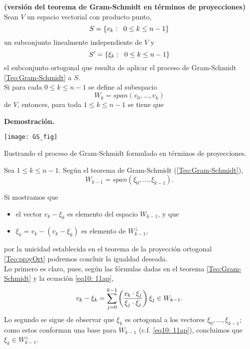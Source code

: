 \begin{prop} \label{Prop:Gram-Schmidt2}
\textbf{(versión del teorema de Gram-Schmidt en términos de
proyecciones)}
Sean $V$ un espacio vectorial con producto punto,
\[
S=\{ v_{k} : \hspace{0.2cm} 0 \leq k \leq n-1 \}
\] un subconjunto
linealmente independiente de $V$ y
\[
S' =\{ \xi_{k} : \hspace{0.2cm} 0 \leq k \leq n-1 \}
\] el subconjunto
ortogonal que resulta de aplicar el proceso de
Gram-Schmidt \ref{Teo:Gram-Schmidt} a $S$. \\

Si para cada $0 \leq k \leq n-1$ se define al subespacio
\[
W_{k}= span(v_{0}, \ldots , v_{k}) 
\]
de $V$, entonces, para toda $1 \leq k \leq n-1$
se tiene que 
\begin{center}
\end{center}
\end{prop}
\noindent
\textbf{Demostración.}

\begin{marginfigure}
\texttt{[image: GS\_fig]} 
		\caption{Ilustrando el proceso de Gram-Schmidt formulado 
		en términos de proyecciones.}
\end{marginfigure}

\noindent
Sea $1 \leq k \leq n-1$.
Según el teorema de Gram-Schmidt (\ref{Teo:Gram-Schmidt}),
\begin{equation}
\label{eq10: 11ap}
W_{k-1}=span(\xi_{0}, \ldots , \xi_{k-1}).
\end{equation}

\noindent
Si mostramos que
\begin{itemize}
	\item el vector $v_{k}-\xi_{k}$ es elemento
	del espacio $W_{k-1}$, y que
	\item $\xi_{k}=v_{k}-(v_{k}-\xi_{k})$
	es elemento de $W_{k-1}^{\perp}$,
\end{itemize}
por la unicidad establecida en
el teorema de la proyección ortogonal \ref{Teo:proyOrt}
podremos concluir la igualdad deseada. \\
Lo primero es claro, pues, según las fórmulas
dadas en el teorema \ref{Teo:Gram-Schmidt}
y la ecuación \eqref{eq10: 11ap},
\[
v_{k}-\xi_{k}= 
\sum\limits_{j=0}^{k-1}
\left( \frac{v_{k} \cdot \xi_{j}}{\xi_{j} \cdot \xi_{j}} \right) \xi_{j} \in W_{k-1}.
\]
Lo segundo se sigue de observar que
$\xi_{k}$ es ortogonal a los vectores $\xi_{0}, \ldots , \xi_{k-1}$;
como estos conforman una base para $W_{k-1}$
(c.f. \eqref{eq10: 11ap}), concluimos
que $\xi_{k} \in W_{k-1}^{\perp}$.

